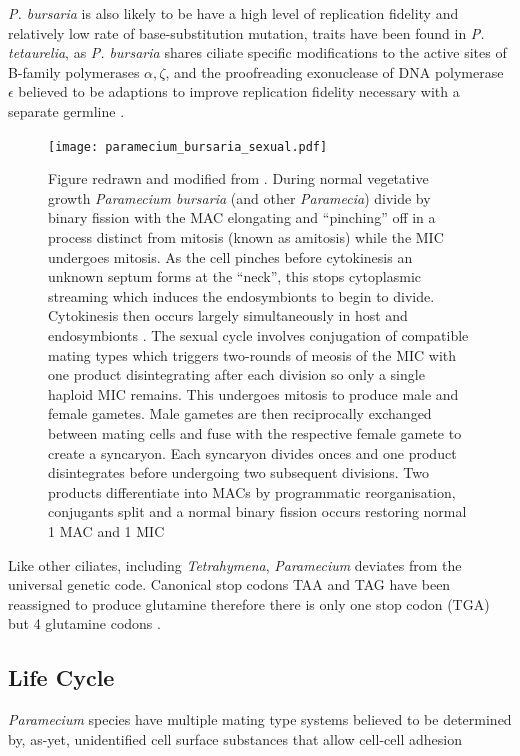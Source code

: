 \textit{P. bursaria} is also likely to be have a high level of replication fidelity and relatively low rate of base-substitution mutation,
traits have been found in \textit{P. tetaurelia}, as \textit{P. bursaria} shares ciliate specific modifications to the active sites
of B-family polymerases \(\alpha, \zeta\), and the proofreading exonuclease of DNA polymerase \(\epsilon\) believed to be adaptions to
improve replication fidelity necessary with a separate germline \citep{Sung2012}.

\begin{figure}[h!]
    \caption{
        Figure redrawn and modified from \citep{Duret2008}.
        During normal vegetative growth \textit{Paramecium bursaria} (and other \textit{Paramecia}) divide by binary fission with the MAC
        elongating and ``pinching'' off in a process distinct from mitosis (known as amitosis) while the MIC undergoes mitosis.
        As the cell pinches before cytokinesis an unknown septum forms at the ``neck'', this stops cytoplasmic streaming which induces
        the endosymbionts to begin to divide. Cytokinesis then occurs largely simultaneously in host and endosymbionts \citep{Kadono2004,Takahashi2007}.
        The sexual cycle involves conjugation of compatible mating types which triggers two-rounds of meosis of the MIC with
        one product disintegrating after each division so only a single haploid MIC remains. This undergoes mitosis to produce male and
        female gametes. Male gametes are then reciprocally exchanged between mating cells and fuse with the respective female gamete to 
        create a syncaryon. Each syncaryon divides onces and one product disintegrates before undergoing two subsequent divisions.
        Two products differentiate into MACs by programmatic reorganisation, conjugants split and a normal binary fission occurs 
    restoring normal 1 MAC and 1 MIC \citep{Siegel1963} }%
\texttt{[image: paramecium\_bursaria\_sexual.pdf]}
\end{figure}

Like other ciliates, including \textit{Tetrahymena}, \textit{Paramecium} deviates from the universal genetic code.
Canonical stop codons TAA and TAG have been reassigned to produce glutamine therefore there is only one stop codon (TGA) but 4 glutamine codons \citep{Salim2008}.

\subsection{Life Cycle}
\textit{Paramecium} species have multiple mating type systems believed to be determined by, as-yet, unidentified cell surface substances
that allow cell-cell adhesion 
\citep{} %

